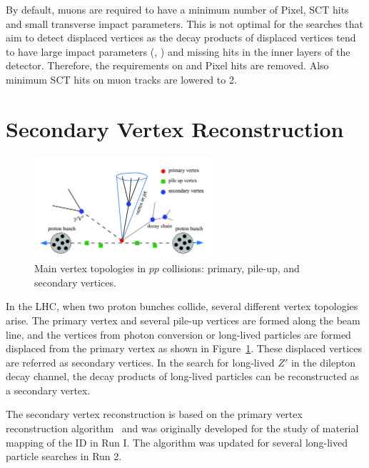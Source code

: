 By default, muons are required to have a minimum number of Pixel, SCT hits and small transverse impact parameters. This is not optimal for the searches that aim to detect displaced vertices as the decay products of displaced vertices tend to have large impact parameters (\dzero, \zzero) and missing hits in the inner layers of the detector. Therefore, the requirements on \dzero and Pixel hits are removed. Also minimum SCT hits on muon tracks are lowered to 2.

\section{Secondary Vertex Reconstruction}
\label{sec:reco:dv}

\begin{figure}[!htb]
    \includegraphics[width=0.6\textwidth]{figures/vertex.png}
    \centering
    \caption{Main vertex topologies in $pp$ collisions: primary, pile-up, and secondary vertices.}
    \label{fig:vertex_topology}
\end{figure}

In the LHC, when two proton bunches collide, several different vertex topologies arise. The primary vertex and several pile-up vertices are formed along the beam line, and the vertices from photon conversion or long-lived particles are formed displaced from the primary vertex as shown in Figure~\ref{fig:vertex_topology}. These displaced vertices are referred as secondary vertices. In the search for long-lived $Z'$ in the dilepton decay channel, the decay products of long-lived particles can be reconstructed as a secondary vertex.

The secondary vertex reconstruction is based on the primary vertex reconstruction algorithm~\cite{1742-6596-119-3-032033} and was originally developed for the study of material mapping of the ID in Run I. The algorithm was updated for several long-lived particle searches in Run 2.

